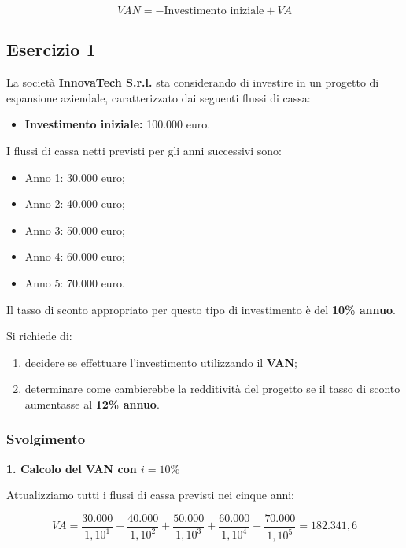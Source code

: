\[
VAN=-\text{Investimento iniziale}+VA
\]
\newpage
\subsection{Esercizio 1}

La società \textbf{InnovaTech S.r.l.} sta considerando di investire in un progetto di espansione aziendale, caratterizzato dai seguenti flussi di cassa:

\begin{itemize}
    \item \textbf{Investimento iniziale:} 100.000 euro.
\end{itemize}

\noindent I flussi di cassa netti previsti per gli anni successivi sono:

\begin{itemize}
    \item Anno 1: 30.000 euro;
    \item Anno 2: 40.000 euro;
    \item Anno 3: 50.000 euro;
    \item Anno 4: 60.000 euro;
    \item Anno 5: 70.000 euro.
\end{itemize}

\noindent Il tasso di sconto appropriato per questo tipo di investimento è del \textbf{10\% annuo}.

\medskip

\noindent Si richiede di:

\begin{enumerate}
    \item decidere se effettuare l'investimento utilizzando il \textbf{VAN};
    \item determinare come cambierebbe la redditività del progetto se il tasso di sconto aumentasse al \textbf{12\% annuo}.
\end{enumerate}

\subsubsection*{Svolgimento}

\noindent\textbf{1. Calcolo del VAN con $i=10\%$}

\noindent Attualizziamo tutti i flussi di cassa previsti nei cinque anni:

\[
VA=
\frac{30.000}{1,10^1}+
\frac{40.000}{1,10^2}+
\frac{50.000}{1,10^3}+
\frac{60.000}{1,10^4}+
\frac{70.000}{1,10^5}
=182.341,6
\]

